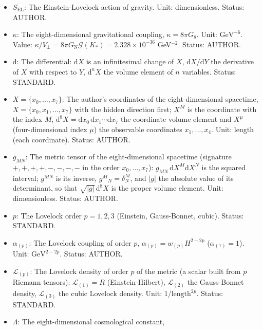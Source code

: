 \documentclass[
  10pt,
]{article}
\providecommand{\tightlist}{%
  \setlength{\itemsep}{0pt}\setlength{\parskip}{0pt}}
\begin{document}
\begin{itemize}
\tightlist
\item
  \(S_{\mathrm{EL}}\): The Einstein-Lovelock action of gravity. Unit:
  dimensionless. Status: AUTHOR.
\item
  \(\kappa\): The eight-dimensional gravitational coupling,
  \(\kappa = 8\pi G_8\). Unit: \(\mathrm{GeV}^{-6}\). Value:
  \(\kappa/V_\perp = 8\pi G_{\mathrm{N}}\mathcal{G}(K_*) = 2.328\times10^{-36}\)
  GeV\(^{-2}\). Status: AUTHOR.
\item
  \(\mathrm{d}\): The differential: \(\mathrm{d}X\) is an infinitesimal
  change of \(X\), \(\mathrm{d}X/\mathrm{d}Y\) the derivative of \(X\)
  with respect to \(Y\), \(\mathrm{d}^nX\) the volume element of \(n\)
  variables. Status: STANDARD.
\item
  \(X = \{x_0, \dots, x_7\}\): The author's coordinates of the
  eight-dimensional spacetime, \(X = \{x_0, x_1, \dots, x_7\}\) with the
  hidden direction first; \(X^M\) is the coordinate with the index
  \(M\),
  \(\mathrm{d}^8X = \mathrm{d}x_0\,\mathrm{d}x_1\cdots\mathrm{d}x_7\)
  the coordinate volume element and \(X^\mu\) (four-dimensional index
  \(\mu\)) the observable coordinates \(x_1, \dots, x_4\). Unit: length
  (each coordinate). Status: AUTHOR.
\item
  \(g_{MN}\): The metric tensor of the eight-dimensional spacetime
  (signature \(+,+,+,+,-,-,-,-\) in the order \(x_0, \dots, x_7\)):
  \(g_{MN}\,\mathrm{d}X^M\mathrm{d}X^N\) is the squared interval;
  \(g^{MN}\) is its inverse, \(g^M{}_N = \delta^M_N\), and
  \(\lvert g\rvert\) the absolute value of its determinant, so that
  \(\sqrt{\lvert g\rvert}\,\mathrm{d}^8X\) is the proper volume element.
  Unit: dimensionless. Status: AUTHOR.
\item
  \(p\): The Lovelock order \(p = 1, 2, 3\) (Einstein, Gauss-Bonnet,
  cubic). Status: STANDARD.
\item
  \(\alpha_{(p)}\): The Lovelock coupling of order \(p\),
  \(\alpha_{(p)} = w_{(p)}H^{2-2p}\) (\(\alpha_{(1)} = 1\)). Unit:
  \(\mathrm{GeV}^{2-2p}\). Status: AUTHOR.
\item
  \(\mathcal{L}_{(p)}\): The Lovelock density of order \(p\) of the
  metric (a scalar built from \(p\) Riemann tensors):
  \(\mathcal{L}_{(1)} = R\) (Einstein-Hilbert), \(\mathcal{L}_{(2)}\)
  the Gauss-Bonnet density, \(\mathcal{L}_{(3)}\) the cubic Lovelock
  density. Unit: 1/\(\mathrm{length}^{2p}\). Status: STANDARD.
\item
  \(\Lambda\): The eight-dimensional cosmological constant,

\end{itemize}
\end{document}
